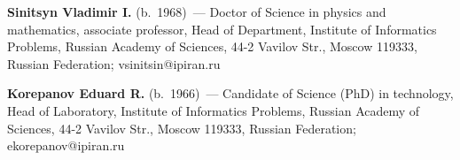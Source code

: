 \vspace*{3pt}


\noindent
\textbf{Sinitsyn Vladimir I.} (b.\ 1968)~---
Doctor of Science in physics and mathematics, associate professor,
Head of Department, Institute of Informatics Problems,
Russian Academy of Sciences, 44-2 Vavilov Str., Moscow 119333,
Russian Federation;  vsinitsin@ipiran.ru


\vspace*{3pt}

\noindent
\textbf{Korepanov Eduard R.} (b.\ 1966)~--- Candidate of Science (PhD)
in technology, Head of Laboratory, Institute of Informatics Problems,
Russian Academy of Sciences, 44-2 Vavilov Str., Moscow 119333,
Russian Federation;   ekorepanov@ipiran.ru


\label{end\stat}

\renewcommand{\bibname}{\protect\rm Литература}